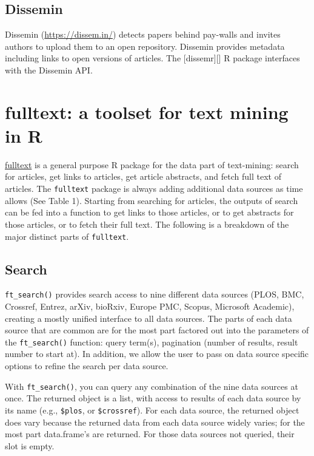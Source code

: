 \documentclass[author-year, review, 11pt]{components/elsarticle} %
\begin{document}
\hypertarget{dissemin}{%
\subsection{Dissemin}\label{dissemin}}

Dissemin (\url{https://dissem.in/}) detects papers behind pay-walls and
invites authors to upload them to an open repository. Dissemin provides
metadata including links to open versions of articles. The
{[}dissemr{]}{[}{]} R package interfaces with the Dissemin API.

\hypertarget{fulltext-a-toolset-for-text-mining-in-r}{%
\section{fulltext: a toolset for text mining in
R}\label{fulltext-a-toolset-for-text-mining-in-r}}

\href{https://github.com/ropensci/fulltext}{fulltext} is a general
purpose R package for the data part of text-mining: search for articles,
get links to articles, get article abstracts, and fetch full text of
articles. The \texttt{fulltext} package is always adding additional data
sources as time allows (See Table 1). Starting from searching for
articles, the outputs of search can be fed into a function to get links
to those articles, or to get abstracts for those articles, or to fetch
their full text. The following is a breakdown of the major distinct
parts of \texttt{fulltext}.

\hypertarget{search}{%
\subsection{Search}\label{search}}

\texttt{ft\_search()} provides search access to nine different data
sources (PLOS, BMC, Crossref, Entrez, arXiv, bioRxiv, Europe PMC,
Scopus, Microsoft Academic), creating a mostly unified interface to all
data sources. The parts of each data source that are common are for the
most part factored out into the parameters of the \texttt{ft\_search()}
function: query term(s), pagination (number of results, result number to
start at). In addition, we allow the user to pass on data source
specific options to refine the search per data source.

With \texttt{ft\_search()}, you can query any combination of the nine
data sources at once. The returned object is a list, with access to
results of each data source by its name (e.g., \texttt{\$plos}, or
\texttt{\$crossref}). For each data source, the returned object does
vary because the returned data from each data source widely varies; for
the most part data.frame's are returned. For those data sources not
queried, their slot is empty.
\end{document}
